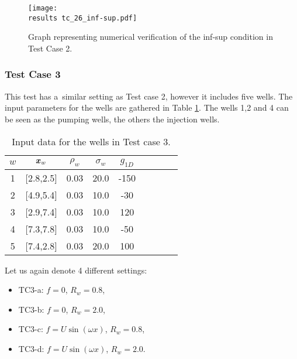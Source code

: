 %
\begin{figure}[!htb]
    \centering
    \texttt{[image: \\results tc\_26\_inf-sup.pdf]}
    \caption[numerical verification of inf-sup condition TC2]
    {Graph representing numerical verification of the inf-sup condition in Test Case 2.}
    \label{fig:mh_tc2_inf_sup}
\end{figure}
%



\subsubsection{Test Case 3}
This test has a~similar setting as Test case 2, however it includes five wells.
The input parameters for the wells are gathered in Table \ref{tab:tc3_data}.
The wells 1,2 and 4 can be seen as the pumping wells, the others the injection wells.
%
\begin{table}[!htb]
\begin{center}
\begin{tabular}{ccccccccc}
\toprule
$w$ & $\mathbf{\boldsymbol{x}}_w$  & $\rho_w$ & $\sigma_w$ & $g_{1D}$\\
\midrule
1& [2.8,2.5] & 0.03 & 20.0 & -150 \\
2& [4.9,5.4] & 0.03 & 10.0 & -30 \\
3& [2.9,7.4] & 0.03 & 10.0 & 120 \\
4& [7.3,7.8] & 0.03 & 10.0 & -50 \\
5& [7.4,2.8] & 0.03 & 20.0 & 100 \\
\bottomrule
\end{tabular}
\caption{Input data for the wells in Test case 3.}
\label{tab:tc3_data}
\end{center}
\end{table}

Let us again denote 4 different settings:
\begin{itemize}
    \item TC3-a: $f=0$, $R_w=0.8$,
    \item TC3-b: $f=0$, $R_w=2.0$,
    \item TC3-c: $f=U\sin(\omega x)$, $R_w=0.8$,
    \item TC3-d: $f=U\sin(\omega x)$, $R_w=2.0$.
\end{itemize}

